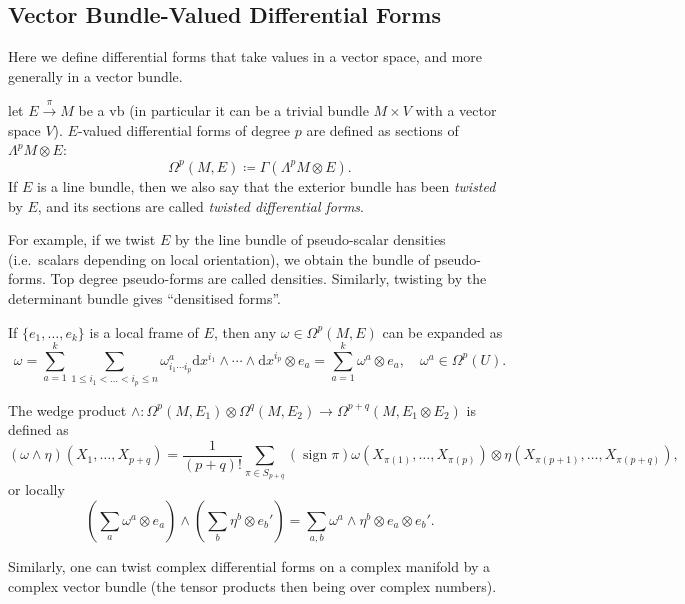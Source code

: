 \documentclass[english,letterpaper]{article}%
\numberwithin{equation}{section}
\numberwithin{figure}{section}
\numberwithin{table}{section}
\theoremstyle{definition}
\theoremstyle{definition}
\theoremstyle{definition}
\theoremstyle{plain}
\theoremstyle{plain}
\theoremstyle{plain}
\theoremstyle{plain}
\theoremstyle{remark}
\theoremstyle{remark}
\newcommand{\dd}{{\mathrm{d}}}
\renewcommand{\leq}{\leqslant}
\DeclareMathOperator{\sign}{sign}
\begin{document}
\subsection{Vector Bundle-Valued Differential Forms}

Here we define differential forms that take values in a vector space, and more generally in a vector bundle.

\begin{defn}
    let $E\overset\pi\to M$ be a \gls{vb} (in particular it can be a trivial bundle $M\times V$ with a vector space $V$). $E$-valued differential forms of degree $p$ are defined as sections of $\Lambda^pM\otimes E$:
    \[\Omega^p(M,E)\coloneqq \Gamma(\Lambda^pM\otimes E).\]
     If $E$ is a line bundle, then we also say that the exterior bundle has been \emph{twisted} by $E$, and its sections are called \emph{twisted differential forms}.
\end{defn}

For example, if we twist $E$ by the line bundle of pseudo-scalar densities (i.e.\ scalars depending on local orientation), we obtain the bundle of pseudo-forms. Top degree pseudo-forms are called densities. Similarly, twisting by the determinant bundle gives ``densitised forms''.

If $\{e_1,\ldots,e_k\}$ is a local frame of $E$, then any $\omega\in\Omega^p(M,E)$ can be expanded as 
\[\omega=\sum_{a=1}^k\sum_{1\leq i_1<\ldots<i_p\leq n}\omega^a_{i_1\cdots i_p}\dd x^{i_1}\wedge\cdots\wedge \dd x^{i_p}\otimes e_a=\sum_{a=1}^k\omega^a\otimes e_a,\quad \omega^a\in\Omega^p(U).\]

The wedge product $\wedge:\Omega^p(M,E_1)\otimes \Omega^q(M,E_2)\to \Omega^{p+q}(M,E_1\otimes E_2)$ is defined as 
\[(\omega\wedge\eta)(X_1,\ldots,X_{p+q})=\frac{1}{(p+q)!}\sum_{\pi\in S_{p+q}}(\sign\pi)\omega(X_{\pi(1)},\ldots,X_{\pi(p)})\otimes\eta(X_{\pi(p+1)},\ldots,X_{\pi(p+q)}),\]
or locally 
\[\left(\sum_a\omega^a\otimes e_a\right)\wedge \left(\sum_b\eta^b\otimes e_b'\right)=\sum_{a,b}\omega^a\wedge\eta^b\otimes e_a\otimes e_b'.\]

Similarly, one can twist complex differential forms on a complex manifold by a complex vector bundle (the tensor products then being over complex numbers).
\end{document}
